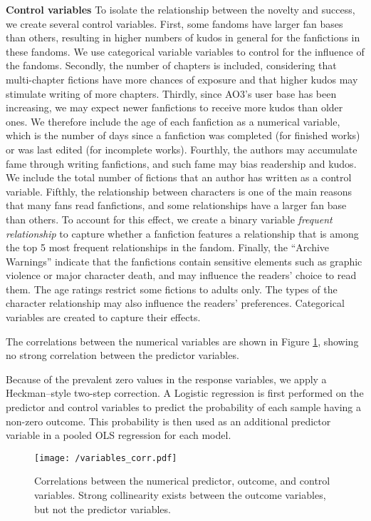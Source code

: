 \documentclass[letterpaper]{article} %
\begin{document}
\textbf{Control variables}   To isolate the relationship between the novelty and success, we create several control variables. First, some fandoms have larger fan bases than others, resulting in higher numbers of kudos in general for the fanfictions in these fandoms. We use categorical variable variables to control for the influence of the fandoms. Secondly, the number of chapters is included, considering that multi-chapter fictions have more chances of exposure and that higher kudos may stimulate writing of more chapters. Thirdly, since AO3's user base has been increasing, we may expect newer fanfictions to receive more kudos than older ones. We therefore include the age of each fanfiction as a numerical variable, which is the number of days since a fanfiction was completed (for finished works) or was last edited (for incomplete works). Fourthly, the authors may accumulate fame through writing fanfictions, and such fame may bias readership and kudos. We include the total number of fictions that an author has written as a control variable. Fifthly, the relationship between characters is one of the main reasons that many fans read fanfictions, and some relationships have a larger fan base than others. To account for this effect, we create a binary variable \emph{frequent relationship} to capture whether a fanfiction features a relationship that is among the top 5 most frequent relationships in the fandom. Finally, the ``Archive Warnings'' indicate that the fanfictions contain sensitive elements such as graphic violence or major character death, and may influence the readers' choice to read them. The age ratings restrict some fictions to adults only. The types of the character relationship may also influence the readers' preferences. Categorical variables are created to capture their effects.
 
The correlations between the numerical variables are shown in Figure \ref{fig:corr}, showing no strong correlation between the predictor variables.

Because of the prevalent zero values in the response variables, we apply a Heckman--style two-step correction. A Logistic regression is first performed on the predictor and control variables to predict the probability of each sample having a non-zero outcome. This probability is then used as an additional predictor variable in a pooled OLS regression for each model.

\begin{figure}
    \centering
          \texttt{[image: /variables\_corr.pdf]}
        \caption{Correlations between the numerical predictor, outcome, and control variables. Strong collinearity exists between the outcome variables, but not the predictor variables. }
        \label{fig:corr}
\end{figure}
\end{document}

